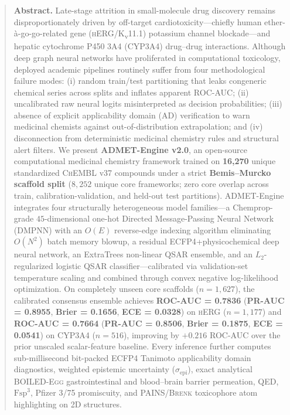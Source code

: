 \documentclass[10pt,twocolumn,letterpaper]{article}
\newcommand{\sige}{\sigma_{\mathrm{epi}}}
\begin{document}
\begin{@twocolumnfalse}
  \begin{quote}
    \small\noindent\textbf{\color{InkSlate}Abstract.}
    Late-stage attrition in small-molecule drug discovery remains disproportionately driven by off-target cardiotoxicity—chiefly human ether-\`{a}-go-go-related gene (\textsc{hERG}/K\textsubscript{v}11.1) potassium channel blockade—and hepatic cytochrome P450 3A4 (\textsc{CYP3A4}) drug–drug interactions. Although deep graph neural networks have proliferated in computational toxicology, deployed academic pipelines routinely suffer from four methodological failure modes: (i) random train/test partitioning that leaks congeneric chemical series across splits and inflates apparent \textsc{ROC-AUC}; (ii) uncalibrated raw neural logits misinterpreted as decision probabilities; (iii) absence of explicit applicability domain (\textsc{AD}) verification to warn medicinal chemists against out-of-distribution extrapolation; and (iv) disconnection from deterministic medicinal chemistry rules and structural alert filters. We present \textbf{ADMET-Engine v2.0}, an open-source computational medicinal chemistry framework trained on \textbf{16,270} unique standardized \textsc{ChEMBL} v37 compounds under a strict \textbf{Bemis–Murcko scaffold split} ($8{,}252$ unique core frameworks; zero core overlap across train, calibration-validation, and held-out test partitions). ADMET-Engine integrates four structurally heterogeneous model families—a Chemprop-grade $45$-dimensional one-hot Directed Message-Passing Neural Network (\textsc{DMPNN}) with an $O(E)$ reverse-edge indexing algorithm eliminating $O(N^2)$ batch memory blowup, a residual \textsc{ECFP4}+physicochemical deep neural network, an ExtraTrees non-linear \textsc{QSAR} ensemble, and an $L_2$-regularized logistic \textsc{QSAR} classifier—calibrated via validation-set temperature scaling and combined through convex negative log-likelihood optimization. On completely unseen core scaffolds ($n = 1{,}627$), the calibrated consensus ensemble achieves \textbf{ROC-AUC = 0.7836} (\textbf{PR-AUC = 0.8955}, \textbf{Brier = 0.1656}, \textbf{ECE = 0.0328}) on \textsc{hERG} ($n=1{,}177$) and \textbf{ROC-AUC = 0.7664} (\textbf{PR-AUC = 0.8506}, \textbf{Brier = 0.1875}, \textbf{ECE = 0.0541}) on \textsc{CYP3A4} ($n=516$), improving by $+0.216$ \textsc{ROC-AUC} over the prior unscaled scalar-feature baseline. Every inference further computes sub-millisecond bit-packed \textsc{ECFP4} Tanimoto applicability domain diagnostics, weighted epistemic uncertainty ($\sige$), exact analytical \textsc{BOILED-Egg} gastrointestinal and blood–brain barrier permeation, \textsc{QED}, $\mathrm{Fsp}^3$, Pfizer 3/75 promiscuity, and \textsc{PAINS}/\textsc{Brenk} toxicophore atom highlighting on 2D structures.
  \end{quote}


\end{@twocolumnfalse}
\end{document}
